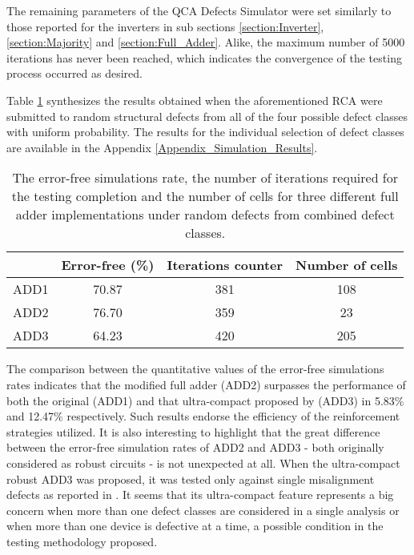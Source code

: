 The remaining parameters of the QCA Defects Simulator were set similarly to those reported for the inverters in sub sections \ref{section:Inverter}, \ref{section:Majority} and \ref{section:Full_Adder}. Alike, the maximum number of 5000 iterations has never been reached, which indicates the convergence of the testing process occurred as desired.

Table \ref{table:fulladder} synthesizes the results obtained when the aforementioned RCA were submitted to random structural defects from all of the four possible defect classes with uniform probability. The results for the individual selection of defect classes are available in the Appendix \ref{Appendix_Simulation_Results}. 

\begin{table}[h]
\centering
\caption{The error-free simulations rate, the number of iterations required for the testing completion and the number of cells for three different full adder implementations under random defects from combined defect classes.}
\label{table:fulladder}
\begin{tabular}{|c|c|c|c|}
\hline
 & Error-free (\%) & Iterations counter & Number of cells \\
\hline
 ADD1 & 70.87 & 381 & 108 \\
\hline
 ADD2 & 76.70 & 359 & 23 \\
\hline
 ADD3 & 64.23 & 420 & 205 \\
\hline

\end{tabular}
\end{table}

The comparison between the quantitative values of the error-free simulations rates indicates that the modified full adder (ADD2) surpasses the performance of both the original (ADD1) and that ultra-compact proposed by  (ADD3) in 5.83\% and 12.47\% respectively. Such results endorse the efficiency of the reinforcement strategies utilized. It is also interesting to highlight that the great difference between the error-free simulation rates of ADD2 and ADD3 - both originally considered as robust circuits - is not unexpected at all. When the ultra-compact robust ADD3 was proposed, it was tested only against single misalignment defects as reported in \cite{roohi15}. It seems that its ultra-compact feature represents a big concern when more than one defect classes are considered in a single analysis or when more than one device is defective at a time, a possible condition in the testing methodology proposed. 

